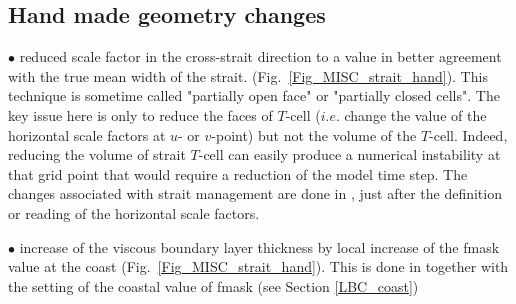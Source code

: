\subsection{Hand made geometry changes}
\label{MISC_strait_hand}

$\bullet$ reduced scale factor in the cross-strait direction to a value in better agreement 
with the true mean width of the strait. (Fig.~\ref{Fig_MISC_strait_hand}).
This technique is sometime called "partially open face" or "partially closed cells".
The key issue here is only to reduce the faces of $T$-cell ($i.e.$ change the value 
of the horizontal scale factors at $u$- or $v$-point) but not the volume of the $T$-cell.
Indeed, reducing the volume of strait $T$-cell can easily produce a numerical 
instability at that grid point that would require a reduction of the model time step.
The changes associated with strait management are done in , 
just after the definition or reading of the horizontal scale factors. 

$\bullet$ increase of the viscous boundary layer thickness by local increase of the 
fmask value at the coast (Fig.~\ref{Fig_MISC_strait_hand}). This is done in 
 together with the setting of the coastal value of fmask 
(see Section \ref{LBC_coast})

